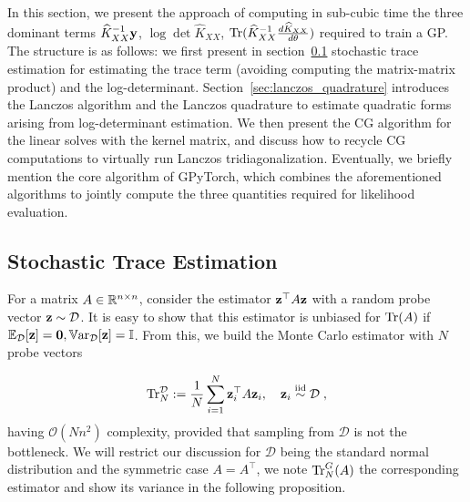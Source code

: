 \documentclass{article}
\begin{document}
In this section, we present the approach of computing in sub-cubic time the three dominant terms $\widehat K_{XX}^{-1} \boldsymbol{\mathbf{y}}$, $\log\det \widehat K_{XX}$, $\operatorname{Tr} ( \widehat K_{XX}^{-1} \frac{d \widehat K_{XX}}{d\theta} )$ required to train a GP.
The structure is as follows: we first present in section~\ref{sec:stoch_trace} stochastic trace estimation for estimating the trace term (avoiding computing the matrix-matrix product) and the log-determinant. 
Section~\ref{sec:lanczos_quadrature} introduces the Lanczos algorithm and the Lanczos quadrature to estimate quadratic forms arising from log-determinant estimation. 
We then present the CG algorithm for the linear solves with the kernel matrix, and discuss how to recycle CG computations to virtually run Lanczos tridiagonalization.
Eventually, we briefly mention the core algorithm of GPyTorch, which combines the aforementioned algorithms to jointly compute the three quantities required for likelihood evaluation.


\subsection{Stochastic Trace Estimation} \label{sec:stoch_trace}

For a matrix $A \in \mathbb R^{n \times n}$, consider the estimator $\boldsymbol{\mathbf{z}}^\top A \boldsymbol{\mathbf{z}}$ with a random probe vector $\boldsymbol{\mathbf{z}} \sim \mathcal D$. It is easy to show that this estimator is unbiased for $\operatorname{Tr} (A)$ if $\E_\mathcal D[\vect z] = \vect 0, \Var_\mathcal D[\vect z] = \Id$. From this, we build the Monte Carlo estimator with $N$ probe vectors

\begin{equation*}
    \operatorname{Tr}_N^\mathcal D := \frac 1 N \sum_{i=1}^N \boldsymbol{\mathbf{z}}_i^\top A \boldsymbol{\mathbf{z}}_i, \quad \boldsymbol{\mathbf{z}}_i \stackrel{\text{iid}}{\sim} \mathcal D \; ,
\end{equation*}
%
having $\mathcal O(Nn^2)$ complexity, provided that sampling from $\mathcal D$ is not the bottleneck. We will restrict our discussion for $\mathcal D$ being the standard normal distribution and the symmetric case $A=A^\top$, we note $\operatorname{Tr}_N^G(A)$ the corresponding estimator and show its variance in the following proposition. 
\end{document}
